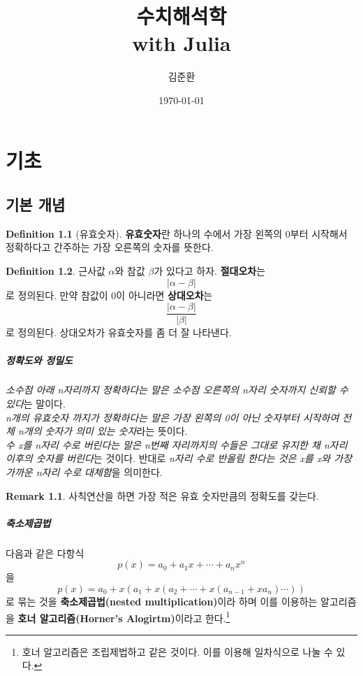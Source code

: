 \documentclass[a4paper, 11pt]{report}
\title{수치해석학 \\with Julia}
\author{김준환}
\date{\today}
\theoremstyle{definition}
\newtheorem*{defn}{Definition}
\newtheorem*{rmk}{Remark}
\begin{document}
\maketitle
\tableofcontents

\renewcommand{\baselinestretch}{1.6}

\chapter{기초}
\section{기본 개념}
\begin{defn}[유효숫자]
\textbf{유효숫자}란 하나의 수에서 가장 왼쪽의 0부터 시작해서 정확하다고 간주하는 가장 오른쪽의 숫자를 뜻한다.
\end{defn}

\begin{defn}
근사값  $\alpha$와 참값 $\beta$가 있다고 하자. \textbf{절대오차}는
\[
|\alpha - \beta|
\]
로 정의된다. 만약 참값이 0이 아니라면 \textbf{상대오차}는
\[
\frac{|\alpha-\beta|}{|\beta|}
\]
로 정의된다. 상대오차가 유효숫자를 좀 더 잘 나타낸다.
\end{defn}

\paragraph{정확도와 정밀도} 
\emph{소수점 아래 n자리까지 정확하다는 말은 소수점 오른쪽의 n자리 숫자까지 신뢰할 수 있다}는 말이다. \\
\emph{n개의 유효숫자 까지가 정확하다는 말은 가장 왼쪽의 0이 아닌 숫자부터 시작하여 전체 n개의 숫자가 의미 있는 숫자}라는 뜻이다. \\
\emph{수 x를 n자리 수로 버린다는 말은 n번째 자리까지의 수들은 그대로 유지한 채 n자리 이후의 숫자를 버린다}는 것이다. 
반대로 \emph{n자리 수로 반올림 한다는 것은 x를 x와 가장 가까운 n자리 수로 대체함}을 의미한다.
\begin{rmk}
    사칙연산을 하면 가장 적은 유효 숫자만큼의 정확도를 갖는다.
\end{rmk}

\paragraph{축소제곱법}
다음과 같은 다항식
\begin{equation}
p(x) = a_0 + a_1x+\cdots +a_nx^n
\end{equation}
을 
\begin{equation}
p(x) = a_0 + x(a_1+x(a_2 + \cdots + x(a_{n-1} +xa_n) \cdots ))
\end{equation}
로 묶는 것을 \textbf{축소제곱법(nested multiplication)}이라 하며 이를 이용하는 알고리즘을 \textbf{호너 알고리즘(Horner's Alogirtm)}이라고 한다.\footnote{호너 알고리즘은 조립제법하고 같은 것이다. 이를 이용해 일차식으로 나눌 수 있다.}
\end{document}
